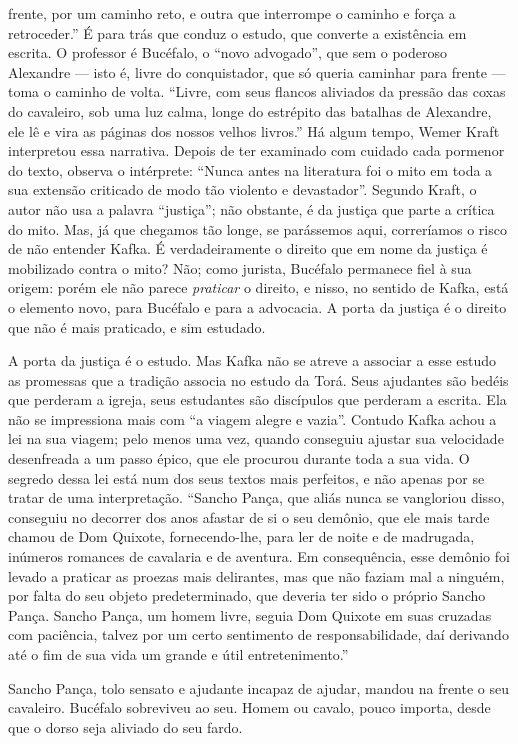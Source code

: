 frente, por um caminho reto, e outra que interrompe o caminho e força a
retroceder.'' É para trás que conduz o estudo, que converte a existência
em escrita. O professor é Bucéfalo, o ``novo advogado'', que sem o
poderoso Alexandre --- isto é, livre do conquistador, que só queria
caminhar para frente --- toma o caminho de volta. ``Livre, com seus
flancos aliviados da pressão das coxas do cavaleiro, sob uma luz calma,
longe do estrépito das batalhas de Alexandre, ele lê e vira as páginas
dos nossos velhos livros.'' Há algum tempo, Wemer Kraft interpretou essa
narrativa. Depois de ter examinado com cuidado cada pormenor do texto,
observa o intérprete: ``Nunca antes na literatura foi o mito em toda a
sua extensão criticado de modo tão violento e devastador''. Segundo
Kraft, o autor não usa a palavra ``justiça''; não obstante, é da justiça
que parte a crítica do mito. Mas, já que chegamos tão longe, se
parássemos aqui, correríamos o risco de não entender Kafka. É
verdadeiramente o direito que em nome da justiça é mobilizado contra o
mito? Não; como jurista, Bucéfalo permanece fiel à sua origem: porém ele
não parece \textit{praticar} o direito, e nisso, no sentido de Kafka, está o
elemento novo, para Bucéfalo e para a advocacia. A porta da justiça é o
direito que não é mais praticado, e sim estudado.

A porta da justiça é o estudo. Mas Kafka não se atreve a associar a esse
estudo as promessas que a tradição associa no estudo da Torá. Seus
ajudantes são bedéis que perderam a igreja, seus estudantes são
discípulos que perderam a escrita. Ela não se impressiona mais com ``a
viagem alegre e vazia''. Contudo Kafka achou a lei na sua viagem; pelo
menos uma vez, quando conseguiu ajustar sua velocidade desenfreada a um
passo épico, que ele procurou durante toda a sua vida. O segredo dessa
lei está num dos seus textos mais perfeitos, e não apenas por se tratar
de uma interpretação. ``Sancho Pança, que aliás nunca se vangloriou
disso, conseguiu no decorrer dos anos afastar de si o seu demônio, que
ele mais tarde chamou de Dom Quixote, fornecendo-lhe, para ler de noite
e de madrugada, inúmeros romances de cavalaria e de aventura. Em
consequência, esse demônio foi levado a praticar as proezas mais
delirantes, mas que não faziam mal a ninguém, por falta do seu objeto
predeterminado, que deveria ter sido o próprio Sancho Pança. Sancho
Pança, um homem livre, seguia Dom Quixote em suas cruzadas com
paciência, talvez por um certo sentimento de responsabilidade, daí
derivando até o fim de sua vida um grande e útil entretenimento.''

Sancho Pança, tolo sensato e ajudante incapaz de ajudar, mandou na
frente o seu cavaleiro. Bucéfalo sobreviveu ao seu. Homem ou cavalo,
pouco importa, desde que o dorso seja aliviado do seu fardo.
